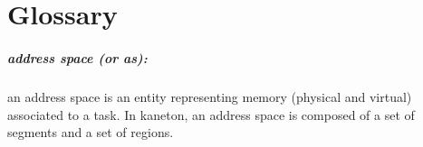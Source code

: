 
%
%

\chapter{Glossary}

\newpage

\paragraph{address space (or as):}
an  address  space is  an  entity  representing  memory (physical  and
virtual)  associated  to a  task.  In  kaneton,  an address  space  is
composed of a set of segments and a set of regions.




